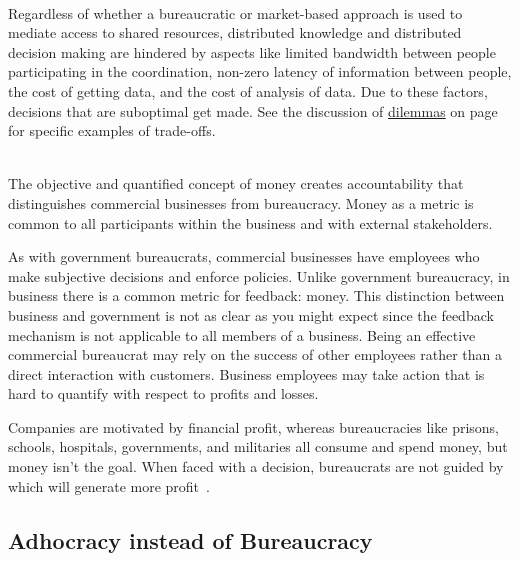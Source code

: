 \ \\

Regardless of whether a bureaucratic or market-based approach is used to mediate access to \glspl{shared resource}, 
distributed knowledge and distributed decision making are hindered by aspects like
limited bandwidth between people participating in the coordination,
non-zero latency of information between people,
the cost of getting data,
and
the cost of analysis of data.
Due to these factors, decisions that are suboptimal get made. See  %
the discussion of 
\hyperref[sec:dilemma-trilemma]{dilemmas} on page~\pageref{sec:dilemma-trilemma} 
for specific examples of trade-offs.

\ \\

The objective and quantified concept of money creates accountability that distinguishes commercial businesses from bureaucracy. Money as a metric is common to all participants within the business and with external stakeholders. 

As with government bureaucrats, commercial businesses have employees who make subjective decisions and enforce policies. Unlike government bureaucracy, in business there is a common metric for feedback: money. This distinction between business and government is not as clear as you might expect since the feedback mechanism is not applicable to all members of a business. Being an effective commercial bureaucrat may rely on the success of other employees rather than a direct interaction with customers. Business employees may take action that is hard to quantify with respect to profits and losses.

Companies are motivated by financial profit, whereas bureaucracies like prisons, schools, hospitals, governments, and militaries all consume and spend money, but money isn't the goal. When faced with a decision, bureaucrats are not guided by which will generate more profit~\cite{2012_Wilson}.

\subsection*{Adhocracy instead of Bureaucracy}

